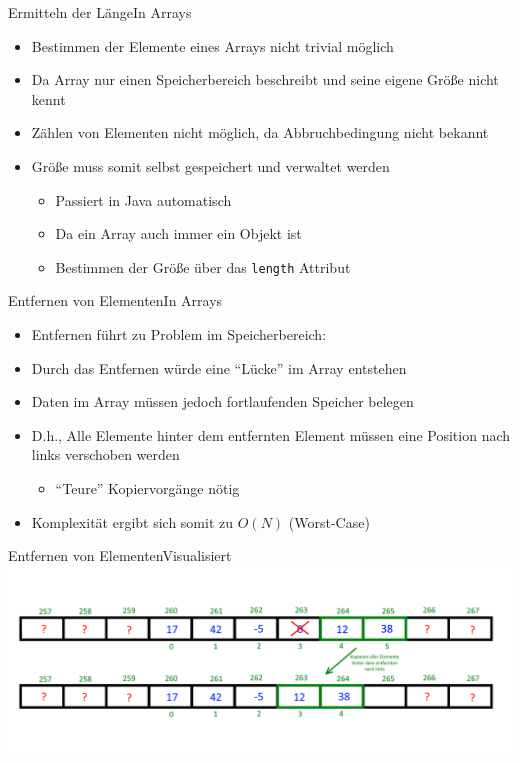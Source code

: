 \begin{frame}{Ermitteln der Länge}{In Arrays}
	\begin{itemize}
		\item Bestimmen der Elemente eines Arrays nicht trivial möglich
		\item Da Array nur einen Speicherbereich beschreibt und seine eigene Größe nicht kennt
		\item Zählen von Elementen nicht möglich, da Abbruchbedingung nicht bekannt
		\item Größe muss somit selbst gespeichert und verwaltet werden
		\begin{itemize}
			\item Passiert in Java automatisch
			\item Da ein Array auch immer ein Objekt ist
			\item Bestimmen der Größe über das \texttt{length} Attribut
		\end{itemize}
	\end{itemize}
\end{frame}

\begin{frame}{Entfernen von Elementen}{In Arrays}
	\begin{itemize}
		\item Entfernen führt zu Problem im Speicherbereich:
		\item Durch das Entfernen würde eine "`Lücke"' im Array entstehen
		\item Daten im Array müssen jedoch fortlaufenden Speicher belegen
		\item D.h., Alle Elemente hinter dem entfernten Element müssen eine Position nach links verschoben werden
		\begin{itemize}
			\item "`Teure"' Kopiervorgänge nötig
		\end{itemize}
		\item Komplexität ergibt sich somit zu $O(N)$ (Worst-Case)
	\end{itemize}
\end{frame}

\begin{frame}{Entfernen von Elementen}{Visualisiert}
\includegraphics[width=\textwidth]{graph/array_remove}
\end{frame}

